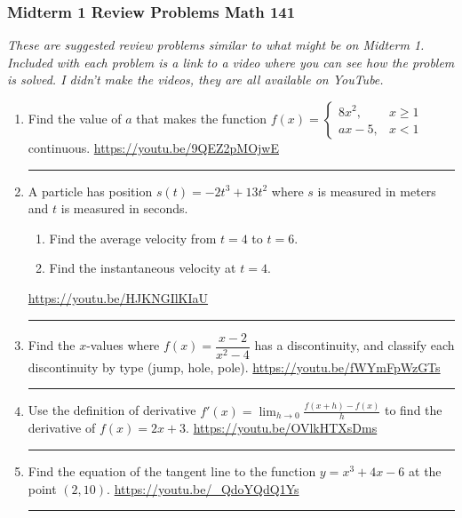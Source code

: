 \documentclass[12pt]{article}
\newcommand{\ds}{\displaystyle}
\begin{document}
\pagestyle{empty}
\subsubsection*{Midterm 1 Review Problems \hfill Math 141 }
\textit{These are suggested review problems similar to what might be on Midterm 1. Included with each problem is a link to a video where you can see how the problem is solved. I didn't make the videos, they are all  available on YouTube.}

\begin{enumerate}
\item Find the value of $a$ that makes the function $\ds f(x) = \begin{cases} 8x^2, & x \ge 1 \\ ax - 5, & x < 1 \end{cases}$ continuous.
\vfill 
\hfill  \url{https://youtu.be/9QEZ2pMOjwE} 
\hrule 

\item A particle has position $s(t) = - 2 t^3 + 13 t^2$ where $s$ is measured in meters and $t$ is measured in seconds. 
\begin{enumerate}
\item Find the average velocity from $t= 4$ to $t=6$.
\item Find the instantaneous velocity at $t = 4$. 
\end{enumerate}
\vfill 
\hfill  \url{https://youtu.be/HJKNGIlKIaU} 
\hrule 

\item Find the $x$-values where $f(x) = \dfrac{x-2}{x^2 - 4}$ has a discontinuity, and classify each discontinuity by type (jump, hole, pole). 
\vfill
\hfill \url{https://youtu.be/fWYmFpWzGTs}
\hrule



\newpage

\item Use the definition of derivative $\ds f'(x) = \lim_{h \rightarrow 0} \frac{f(x+h) - f(x)}{h}$ to find the derivative of $f(x) = 2x + 3$. 
\vfill
\hfill \url{https://youtu.be/OVlkHTXsDms}
\hrule

\item Find the equation of the tangent line to the function $y = x^3  + 4x - 6$ at the point $(2,10)$. 
\vfill
\hfill \url{https://youtu.be/_QdoYQdQ1Ys}
\hrule



\end{enumerate}
\end{document}
